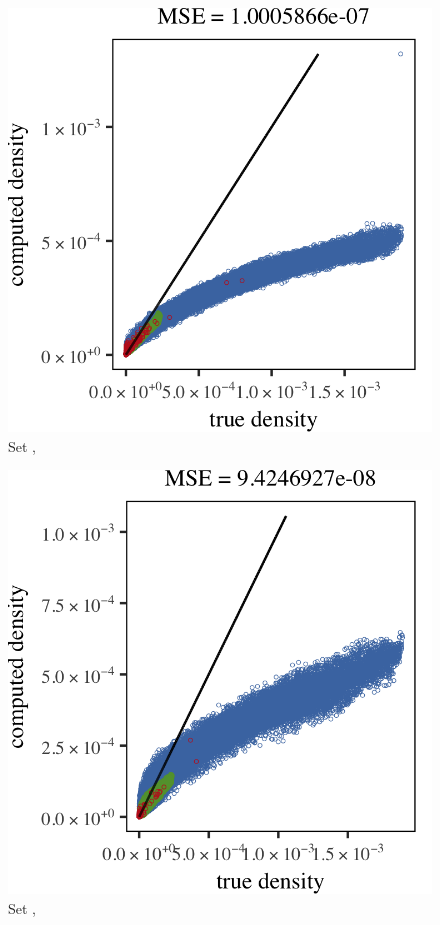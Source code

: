 \begin{subfigure}{0.23\textwidth}
	\centering
	\includegraphics[keepaspectratio=true, width=\textwidth, height=0.23\textheight]{result/img/all/results_ferdosi_2_60000_sambe_silverman}
	\caption{Set \ferdosiTwo, \sambe}
	\label{fig:4:results:sambe:ferdosi2}
\end{subfigure}
\begin{subfigure}{0.23\textwidth}
	\centering
	\includegraphics[keepaspectratio=true, width=\textwidth, height=0.23\textheight]{result/img/all/results_baakman_2_60000_sambe_silverman}
	\caption{Set \baakmanTwo, \sambe}
	\label{fig:4:simulated:datasets:sambe:baakman2}
\end{subfigure}
